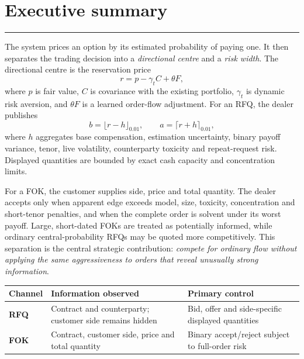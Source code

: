 \documentclass[10pt,a4paper]{article}
\newcommand{\1}{\mathbf{1}}
\newcommand{\sectionrule}{\vspace{-2pt}\noindent\color{navy}\rule{\textwidth}{0.7pt}\color{black}\vspace{2pt}}
\begin{document}
\hypersetup{pageanchor=true}
\setcounter{page}{2}
\small
\setcounter{tocdepth}{1}

\thispagestyle{fancy}
\tableofcontents
\vspace{0.2cm}
\section*{Executive summary}
\sectionrule

The system prices an option by its estimated probability of paying one.  It then
separates the trading decision into a \emph{directional centre} and a \emph{risk
width}.  The directional centre is the reservation price
\[
 r=p-\gamma_t C+\theta F,
\]
where $p$ is fair value, $C$ is covariance with the existing portfolio,
$\gamma_t$ is dynamic risk aversion, and $\theta F$ is a learned order-flow
adjustment.  For an RFQ, the dealer publishes
\[
 b=\lfloor r-h\rfloor_{0.01},\qquad
 a=\lceil r+h\rceil_{0.01},
\]
where $h$ aggregates base compensation, estimation uncertainty, binary payoff
variance, tenor, live volatility, counterparty toxicity and repeat-request risk.
Displayed quantities are bounded by exact cash capacity and concentration limits.

For a FOK, the customer supplies side, price and total quantity.  The dealer accepts
only when apparent edge exceeds model, size, toxicity, concentration and short-tenor
penalties, and when the complete order is solvent under its worst payoff.  Large,
short-dated FOKs are treated as potentially informed, while ordinary central-probability
RFQs may be quoted more competitively.  This separation is the central strategic
contribution: \emph{compete for ordinary flow without applying the same aggressiveness
to orders that reveal unusually strong information}.

\begin{table}[h]
\centering\small
\begin{tabularx}{\textwidth}{>{\bfseries}p{2.7cm}X X}
\toprule
Channel & Information observed & Primary control \\
\midrule
RFQ & Contract and counterparty; customer side remains hidden & Bid, offer and side-specific displayed quantities \\
FOK & Contract, customer side, price and total quantity & Binary accept/reject subject to full-order risk \\
\bottomrule
\end{tabularx}
\end{table}
\end{document}
